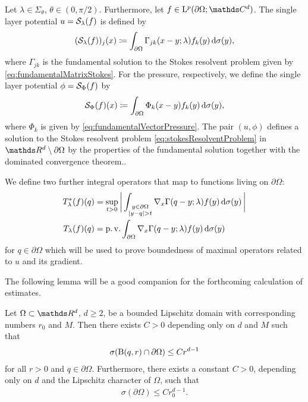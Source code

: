 Let $\lambda \in \Sigma_\theta$, $\theta \in (0,\pi/2)$. 
Furthermore, let $f \in \Ell^p(\partial\Omega; \C^d)$. 
The single layer potential $u = \mathcal{S}_\lambda(f)$ is defined by
\begin{align}
  \label{eq:defSingleLayer}
  (\mathcal{S}_\lambda(f))_j(x) 
  \coloneqq \int_{\partial\Omega} \Gamma_{jk}(x - y; \lambda) f_k(y) \, {\operatorname{d}\!{\sigma}}(y),
\end{align}
where $\Gamma_{jk}$ is the fundamental solution to the Stokes resolvent problem given by \eqref{eq:fundamentalMatrixStokes}.
For the pressure, respectively, we define the single layer potential $\phi = \mathcal{S}_\Phi(f)$ by
\begin{align}
  \label{eq:defSingleLayerPressure}
  \mathcal{S}_{\Phi}(f)(x) \coloneqq \int_{\partial\Omega} \Phi_k(x - y) f_k(y) \, {\operatorname{d}\!{\sigma}}(y),
\end{align}
where $\Phi_k$ is given by \eqref{eq:fundamentalVectorPressure}.
The pair $(u,\phi)$ defines a solution to the Stokes resolvent problem \eqref{eq:stokesResolventProblem} in $\R^d \setminus \partial\Omega$ by the properties of the fundamental solution together with the dominated convergence theorem..

We define two further integral operators that map to functions living on $\partial\Omega$:
\begin{align}
  T_\lambda^*(f)(q) &= \sup_{t > 0} \bigg| \int_{\substack{y \in \partial\Omega \\ |y - q| > t}} \nabla_x \Gamma(q - y; \lambda) f(y) \, {\operatorname{d}\!{\sigma}}(y) \, \bigg| \label{eq:supTOperator}\\
  T_\lambda(f)(q) &= \operatorname{p. v.} \int_{\partial\Omega} \nabla_x \Gamma(q - y; \lambda) f(y) \, {\operatorname{d}\!{\sigma}}(y) \label{eq:pvTOperator}
\end{align}
for $q \in \partial\Omega$ which will be used to prove boundedness of maximal operators related to $u$ and its gradient.

The following lemma will be a good companion for the forthcoming calculation of estimates.
\begin{lem}
  \label{lem:compareBoundaryWithBall}
  Let $\Omega \subset \R^d$, $d \geq 2$, be a bounded Lipschitz domain with corresponding numbers $r_0$ and $M$.
  Then there exists $C > 0$ depending only on $d$ and $M$ such that
  \begin{align*}
    \sigma(\mathrm{B}(q,r) \cap \partial\Omega) \leq C r^{d -1}
  \end{align*}
  for all $r > 0$ and $q \in \partial\Omega$.
  Furthermore, there exists a constant $C > 0$, depending only on $d$ and the Lipschitz character of $\Omega$, such that
  \begin{align*}
    \sigma(\partial\Omega) \leq C r_0^{d - 1}.
\end{align*}
\end{lem}

